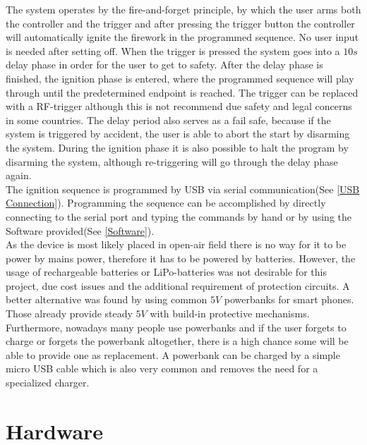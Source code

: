 \noindent The system operates by the fire-and-forget principle, by which the user arms both the controller and the trigger and after pressing the trigger button the controller will automatically ignite the firework in the programmed sequence. No user input is needed after setting off. When the trigger is pressed the system goes into a $10s$ delay phase in order for the user to get to safety. After the delay phase is finished, the ignition phase is entered, where the programmed sequence will play through until the predetermined endpoint is reached. The trigger can be replaced with a RF-trigger although this is not recommend due safety and legal concerns in some countries. The delay period also serves as a fail safe, because if the system is triggered by accident, the user is able to abort the start by disarming the system. During the ignition phase it is also possible to halt the program by disarming the system, although re-triggering will go through the delay phase again.\\

\noindent The ignition sequence is programmed by USB via serial communication(See \cref{USB Connection}). Programming the sequence can be accomplished by directly connecting to the serial port and typing the commands by hand or by using the Software provided(See \cref{Software}).\\

\noindent As the device is most likely placed in open-air field there is no way for it to be power by mains power, therefore it has to be powered by batteries. However, the usage of rechargeable batteries or LiPo-batteries was not desirable for this project, due cost issues and the additional requirement of protection circuits. A better alternative was found by using common $5V$ powerbanks for smart phones. Those already provide steady $5V$ with build-in protective mechanisms. Furthermore, nowadays many people use powerbanks and if the user forgets to charge or forgets the powerbank altogether, there is a high chance some will be able to provide one as replacement. A powerbank can be charged by a simple micro USB cable which is also very common and removes the need for a specialized charger.





\pagebreak

\section{Hardware}
\label{Hardware}


